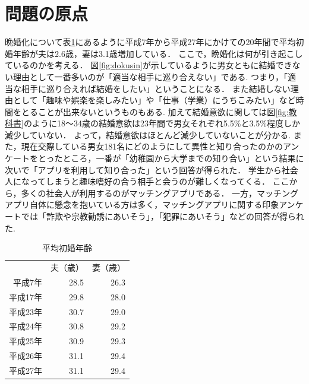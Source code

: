 \documentclass[12pt]{ltjsarticle}
\begin{document}
\section{問題の原点}
晩婚化について表\ref{table:shokon}にあるように平成7年から平成27年にかけての20年間で平均初婚年齢が夫は2.6歳，妻は3.1歳増加している．
ここで，晩婚化は何が引き起こしているのかを考える．
図\ref{fig:dokusin}が示しているように男女ともに結婚できない理由として一番多いのが「適当な相手に巡り合えない」である\cite{doukou}.
つまり，「適当な相手に巡り合えれば結婚をしたい」ということになる．
また結婚しない理由として「趣味や娯楽を楽しみたい」や「仕事（学業）にうちこみたい」など時間をとることが出来ないというものもある\cite{doukou}.
加えて結婚意欲に関しては図\ref{fig:教科書}のように18～34歳の結婚意欲は23年間で男女それぞれ5.5\%と3.5\%程度しか減少していない．
よって，結婚意欲はほとんど減少していないことが分かる.
また，現在交際している男女181名にどのようにして異性と知り合ったのかのアンケートをとったところ，一番が「幼稚園から大学までの知り合い」という結果に次いで「アプリを利用して知り合った」という回答が得られた\cite{cancan}．
学生から社会人になってしまうと趣味嗜好の合う相手と会うのが難しくなってくる．
ここから，多くの社会人が利用するのがマッチングアプリである．
一方，マッチングアプリ自体に懸念を抱いている方は多く，マッチングアプリに関する印象アンケートでは「詐欺や宗教勧誘にあいそう」，「犯罪にあいそう」などの回答が得られた\cite{prtimes}.
\begin{table}
\centering
  \caption{平均初婚年齢}
  \label{table:shokon}
  \begin{tabular}{rrr}
   & 夫（歳） & 妻（歳） \\
  平成7年 & 28.5 & 26.3 \\
  平成17年 & 29.8 & 28.0 \\
  平成23年 & 30.7 & 29.0 \\
  平成24年 & 30.8 & 29.2 \\
  平成25年 & 30.9 & 29.3 \\
  平成26年 & 31.1 & 29.4 \\
  平成27年 & 31.1 & 29.4 \\
  \end{tabular}
  \end{table}
\end{document}
